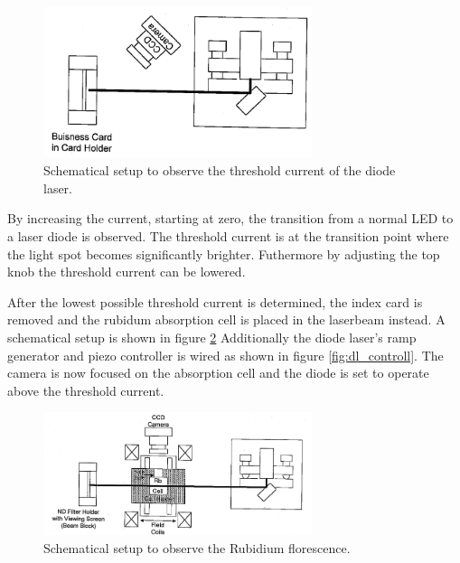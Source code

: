 \begin{figure}
  \centering
  \includegraphics[width=0.7\textwidth]{setup1.png}
  \caption{Schematical setup to observe the threshold current of the diode laser.\cite{V61}}
  \label{fig:setup1}
\end{figure}
By increasing the current, starting at zero, the transition from
a normal LED to a laser diode is observed.
The threshold current is at the
transition point where the light spot becomes significantly brighter.
Futhermore by adjusting the top knob the threshold current can be lowered.


After the lowest possible threshold current is determined, the
index card is removed and
the rubidum absorption cell
is placed in the laserbeam instead.
A schematical setup is shown in figure \ref{fig:setup2}
Additionally the diode laser's ramp generator and  piezo controller is wired as shown in figure \ref{fig:dl_controll}.
The camera is now
focused on the absorption cell and
the diode is set to operate above the threshold current.
\begin{figure}
  \centering
  \includegraphics[width=0.7\textwidth]{setup2.png}
  \caption{Schematical setup to observe the Rubidium florescence.\cite{V61}}
  \label{fig:setup2}
\end{figure}

